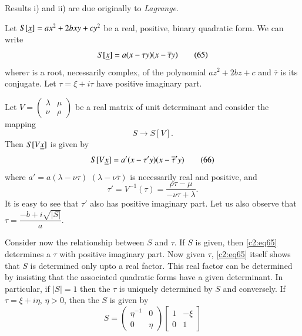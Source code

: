 Results i) and ii) are due originally to {\em Lagrange}.

Let $S[\underline{x}]=ax^{2}+2bxy+cy^{2}$ be a real, positive, binary
quadratic form. We can write
\begin{equation*}
S[\underline{x}]=a(x-\tau y)(x-\overline{\tau}y)\tag{65}\label{c2:eq65}
\end{equation*}
where\pageoriginale $\tau$ is a root, necessarily complex, of the
polynomial $az^{2}+2bz+c$ and $\overline{\tau}$ is its conjugate. Let
$\tau=\xi+i\tau$ have positive imaginary part.

Let $V=\left(\begin{smallmatrix}\lambda & \mu\\ \nu &
  \rho\end{smallmatrix}\right)$ be a real matrix of unit determinant
  and consider the mapping
$$
S\to S[V].
$$
Then $S[V\underline{x}]$ is given by
\begin{equation*}
S[V\underline{x}]=a'(x-\tau' y)(x-\overline{\tau}'y)\tag{66}\label{c2:eq66}
\end{equation*}
where $a'=a(\lambda-\nu\tau)$ $(\lambda-\nu\overline{\tau})$ is
necessarily real and positive, and
\begin{equation*}
\tau'=V^{-1}(\tau)=\frac{\rho\tau-\mu}{-\nu\tau+\lambda}.\tag{67}\label{c2:eq67}
\end{equation*}
It is easy to see that $\tau'$ also has positive imaginary part. Let
us also observe that $\tau=\dfrac{-b+i\sqrt{|S|}}{a}$. 

Consider now the relationship between $S$ and $\tau$. If $S$ is given,
then \eqref{c2:eq65} determines a $\tau$ with positive imaginary part. Now
given $\tau$, \eqref{c2:eq65} itself shows that $S$ is determined only upto
a real factor. This real factor can be determined by insisting that
the associated quadratic forms have a given determinant. In
particular, if $|S|=1$ then the $\tau$ is uniquely determined by $S$
and conversely. If $\tau=\xi+i\eta$, $\eta>0$, then the $S$ is given by 
\begin{equation*}
S=
\begin{pmatrix}
\eta^{-1} & 0\\
0 & \eta
\end{pmatrix}
\begin{bmatrix}
1 & -\xi\\
0 & 1
\end{bmatrix}\tag{68}\label{c2:eq68}
\end{equation*}

